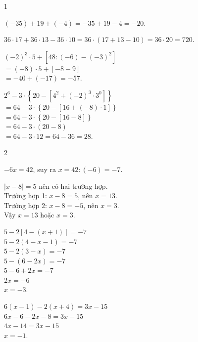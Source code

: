 \begin{Solbook}{1}
 \par \noindent  \begin {listEX} \item $(-35)+19+(-4)=-35+19-4=-20$. \item $36\cdot 17+36\cdot 13-36\cdot 10=36\cdot (17+13-10)=36\cdot 20=720$. \item $(-2)^{3}\cdot 5+\left [48:(-6)-(-3)^{2}\right ]$\\ $=(-8)\cdot 5+\left [-8-9\right ]$\\ $=-40+(-17)=-57$. \item $2^{6}-3\cdot \left \{20-\left [4^{2}+(-2)^{3}\cdot 3^{0}\right ]\right \}$\\ $=64-3\cdot \left \{20-\left [16+(-8)\cdot 1\right ]\right \}$\\ $=64-3\cdot \left \{20-[16-8]\right \}$\\ $=64-3\cdot (20-8)$\\ $=64-3\cdot 12=64-36=28$. \end {listEX}  \hfill \qedEX 
\end{Solbook}
\begin{Solbook}{2}
 \par \noindent  \begin {listEX} \item $-6x=42$, suy ra $x=42:(-6)=-7$. \item $|x-8|=5$ nên có hai trường hợp.\\ Trường hợp 1: $x-8=5$, nên $x=13$.\\ Trường hợp 2: $x-8=-5$, nên $x=3$.\\ Vậy $x=13$ hoặc $x=3$. \item $5-2\left [4-(x+1)\right ]=-7$\\ $5-2(4-x-1)=-7$\\ $5-2(3-x)=-7$\\ $5-(6-2x)=-7$\\ $5-6+2x=-7$\\ $2x=-6$\\ $x=-3$. \item $6(x-1)-2(x+4)=3x-15$\\ $6x-6-2x-8=3x-15$\\ $4x-14=3x-15$\\ $x=-1$. \end {listEX}  \hfill \qedEX 
\end{Solbook}
